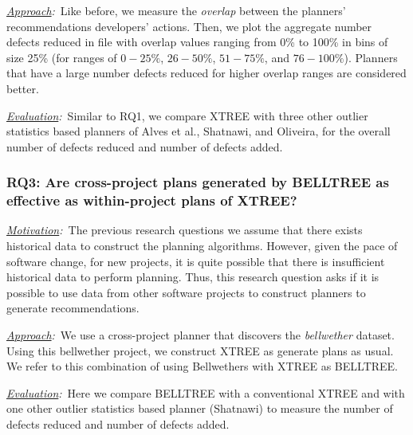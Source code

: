     \item[]\textit{\underline{Approach}:}~Like before, we measure the \textit{overlap} between the planners' recommendations developers' actions. Then, we plot the aggregate number defects reduced in file with overlap values ranging from 0\% to 100\% in bins of size 25\% (for ranges of $0-25\%$, $26-50\%$, $51-75\%$, and $76-100\%$). Planners that have a large number defects reduced for higher overlap ranges are considered better.
 
    \item[]\textit{\underline{Evaluation}:}~Similar to RQ1, we compare XTREE with three other outlier statistics based planners of Alves et al., Shatnawi, and Oliveira, for the overall number of defects reduced and number of defects added.
    \medskip
    \item[]
\compactend

\subsubsection*{RQ3: Are cross-project plans generated by BELLTREE as effective as within-project plans of XTREE?}
\compactlist
    \item[]\textit{\underline{Motivation}:}~The previous research questions we assume that there exists historical data to construct the planning algorithms. However, given the pace of software change, for new projects, it is quite possible that there is insufficient historical data to perform planning. Thus, this research question asks if it is possible to use data from other software projects to construct planners to generate recommendations.
    \item[]\textit{\underline{Approach}:}~We use a cross-project planner that discovers the \textit{bellwether} dataset. Using this bellwether project, we construct XTREE as generate plans as usual. We refer to this combination of using Bellwethers with XTREE as BELLTREE.
    \item[]\textit{\underline{Evaluation}:}~Here we compare BELLTREE with a conventional XTREE and with one other outlier statistics based planner (Shatnawi) to measure the number of defects reduced and number of defects added.
    \medskip
    \item[]
\compactend

